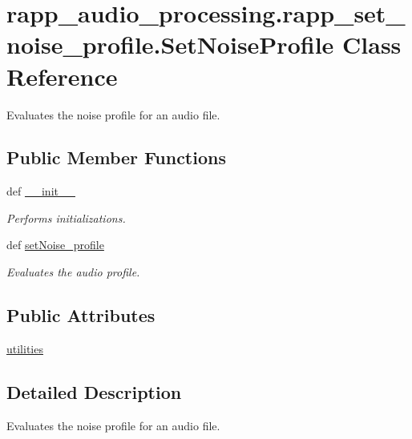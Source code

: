 \hypertarget{classrapp__audio__processing_1_1rapp__set__noise__profile_1_1SetNoiseProfile}{\section{rapp\-\_\-audio\-\_\-processing.\-rapp\-\_\-set\-\_\-noise\-\_\-profile.\-Set\-Noise\-Profile Class Reference}
\label{classrapp__audio__processing_1_1rapp__set__noise__profile_1_1SetNoiseProfile}
}


Evaluates the noise profile for an audio file.  


\subsection*{Public Member Functions}
\begin{DoxyCompactItemize}
\item 
def \hyperlink{classrapp__audio__processing_1_1rapp__set__noise__profile_1_1SetNoiseProfile_aa8ea75d002c23835ffab8c06d5bedac6}{\-\_\-\-\_\-init\-\_\-\-\_\-}
\begin{DoxyCompactList}\small\item\em Performs initializations. \end{DoxyCompactList}\item 
def \hyperlink{classrapp__audio__processing_1_1rapp__set__noise__profile_1_1SetNoiseProfile_ac66a8db5bcb329d44845fa9703a8e547}{set\-Noise\-\_\-profile}
\begin{DoxyCompactList}\small\item\em Evaluates the audio profile. \end{DoxyCompactList}\end{DoxyCompactItemize}
\subsection*{Public Attributes}
\begin{DoxyCompactItemize}
\item 
\hyperlink{classrapp__audio__processing_1_1rapp__set__noise__profile_1_1SetNoiseProfile_a92b867917dda2074b371fe9bb225df73}{utilities}
\end{DoxyCompactItemize}


\subsection{Detailed Description}
Evaluates the noise profile for an audio file. 

